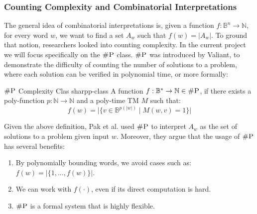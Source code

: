 



\subsubsection{Counting Complexity and Combinatorial Interpretations}

The general idea of combinatorial interpretations is, given a function \(f: \mathbb{B}^n \to \mathbb{N}\),
for every word \(w\), we want to find a set \(A_w\) such that \(f(w) = |A_w|\).
To ground that notion, researchers looked into counting complexity.
In the current project we will focus specifically on the \(\textsc{\#P}\) class.
\(\textsc{\#P}\) was introduced by Valiant\cite{valiant_ComplexityComputingPermanent_1979},
to demonstrate the difficulty of counting the number of solutions to a problem,
where each solution can be verified in polynomial time, or more formally:

\begin{definitionbox}{\(\textnormal{\textsc{\#P}}\) Complexity Clas \cite{valiant_ComplexityComputingPermanent_1979}}{sharpp-class}
    A function \(f: \mathbb{B}^* \to \mathbb{N} \in \textsc{\#P}\), if there exists a
    poly-function \(p : \mathbb{N} \to \mathbb{N}\) and a poly-time TM \(M\) such that:
    \[
        f(w) = \Big|\Big\{v \in \mathbb{B}^{p(|w|)} \mid M(w, v) =1 \Big\}\Big|
    \]
\end{definitionbox}

Given the above definition, Pak et al. \cite{pak_WhatCombinatorialInterpretation_2022, ikenmeyer_PositivitySymmetricGroup_2024}
used $\textsc{\#P}$ to interpret $A_w$ as the set of solutions to a problem given input $w$.
Moreover, they argue that the usage of $\textsc{\#P}$ has several benefits:

\begin{enumerate}
    \item By polynomially bounding words, we avoid cases such as: $f(w) = |\{1, \hdots, f(w)\}|$.
    \item We can work with $f(\cdot)$, even if its direct computation is hard.
    \item $\textsc{\#P}$ is a formal system that is highly flexible.
\end{enumerate}

